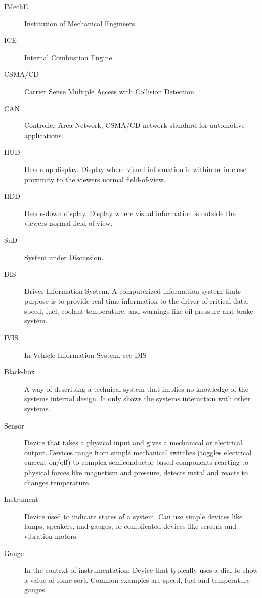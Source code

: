 \label{sec:abbriv}
\vspace{5mm}

\begin{description}
\item[IMechE] Institution of Mechanical Engineers
\item[ICE] Internal Combustion Engine
\item[CSMA/CD] Carrier Sense Multiple Access with Collision Detection
\item[CAN] Controller Area Network, CSMA/CD network standard for automotive applications.
\item[HUD] Heads-up display. Display where visual information is within or in
close proximity to the viewers normal field-of-view.
\item[HDD] Heads-down display. Display where visual information is outside the
viewers normal field-of-view.
\item[SuD] System under Discussion.
\item[DIS] \label{abbriv:DIS}Driver Information System. A computerized
information system thats purpose is to provide real-time information to the
driver of critical data; speed, fuel, coolant temperature, and warnings like
oil pressure and brake system. 
\item[IVIS] In Vehicle Information System, see DIS
\vspace{10mm}
\item[Black-box] A way of describing a technical system that implies no
knowledge of the systems internal design. It only shows the systems interaction
with other systems.
\item[Sensor] Device that takes a physical input and gives a mechanical or
electrical output. Devices range from simple mechanical switches (toggles
electrical current on/off) to complex semiconductor based components reacting
to physical forces like magnetism and pressure, detects metal and reacts to
changes temperature.
\item[Instrument] Device used to indicate states of a system. Can use simple
devices like lamps, speakers, and gauges, or complicated devices like screens
and vibration-motors. 
\item[Gauge] In the context of instrumentation: Device that typically uses a dial to show a value of some sort.
Common examples are speed, fuel and temperature gauges.
\end{description}


